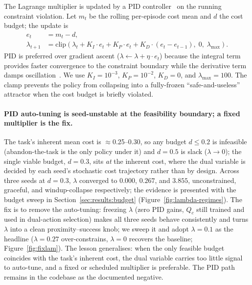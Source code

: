 \documentclass[11pt,a4paper]{report}
\begin{document}
The Lagrange multiplier is updated by a PID
controller~\cite{stooke2020pid} on the running constraint violation.
Let $m_t$ be the rolling per-episode cost mean and $d$ the cost
budget; the update is
\begin{align}
  e_t &= m_t - d, \\
  \lambda_{t+1} &= \mathrm{clip}\!\left(\lambda_t + K_I \cdot e_t
    + K_P \cdot e_t + K_D \cdot (e_t - e_{t-1}),
    \; 0,\; \lambda_{\max}\right).
  \label{eq:pid-lambda}
\end{align}
PID is preferred over gradient ascent
($\lambda \leftarrow \lambda + \eta \cdot e_t$) because the
integral term provides faster convergence to the constraint
boundary while the derivative term damps
oscillation~\cite{stooke2020pid}. We use $K_I = 10^{-3}$,
$K_P = 10^{-2}$, $K_D = 0$, and $\lambda_{\max} = 100$. The clamp
prevents the policy from collapsing into a fully-frozen
``safe-and-useless'' attractor when the cost budget is briefly
violated.

\paragraph{PID auto-tuning is seed-unstable at the feasibility
boundary; a fixed multiplier is the fix.}
The task's inherent mean cost is $\approx$0.25--0.30, so any budget
$d \le 0.2$ is infeasible (abandon-the-task is the only policy under
it) and $d = 0.5$ is slack ($\lambda \to 0$); the single viable
budget, $d = 0.3$, sits \emph{at} the inherent cost, where the dual
variable is decided by each seed's stochastic cost trajectory rather
than by design. Across three seeds at $d = 0.3$, $\lambda$ converged
to $0.000$, $0.267$, and $3.855$, unconstrained, graceful, and
windup-collapse respectively; the evidence is presented with the
budget sweep in Section~\ref{sec:results:budget}
(Figure~\ref{fig:lambda-regimes}). The fix is to remove the
auto-tuning: freezing $\lambda$ (zero PID gains, $Q_c$ still trained
and used in dual-action selection) makes all three seeds behave
consistently and turns $\lambda$ into a clean proximity--success
knob; we sweep it and adopt $\lambda = 0.1$ as the headline
($\lambda = 0.27$ over-constrains, $\lambda = 0$ recovers the
baseline; Figure~\ref{fig:fixlam}). The lesson generalises: when the
only feasible budget coincides with the task's inherent cost, the
dual variable carries too little signal to auto-tune, and a fixed or
scheduled multiplier is preferable. The PID path remains in the
codebase as the documented negative.
\end{document}
